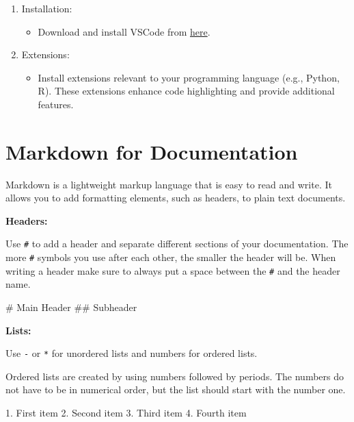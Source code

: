 \documentclass[
  letterpaper,
  DIV=11,
  numbers=noendperiod]{scrreprt}
\newenvironment{Shaded}{}{}
\newcommand{\FunctionTok}[1]{\textcolor[rgb]{0.44,0.26,0.76}{#1}}
\newcommand{\NormalTok}[1]{\textcolor[rgb]{0.14,0.16,0.18}{#1}}
\newcommand{\SpecialStringTok}[1]{\textcolor[rgb]{0.01,0.18,0.38}{#1}}
\providecommand{\tightlist}{%
  \setlength{\itemsep}{0pt}\setlength{\parskip}{0pt}}\usepackage{longtable,booktabs,array}
\begin{document}
\begin{enumerate}
\def\labelenumi{\arabic{enumi}.}
\tightlist
\item
  Installation:

  \begin{itemize}
  \tightlist
  \item
    Download and install VSCode from
    \href{https://code.visualstudio.com/}{here}.
  \end{itemize}
\item
  Extensions:

  \begin{itemize}
  \tightlist
  \item
    Install extensions relevant to your programming language (e.g.,
    Python, R). These extensions enhance code highlighting and provide
    additional features.
  \end{itemize}
\end{enumerate}

\section{Markdown for Documentation}\label{markdown-for-documentation}

Markdown is a lightweight markup language that is easy to read and
write. It allows you to add formatting elements, such as headers, to
plain text documents.

\textbf{Headers:}

Use \texttt{\#} to add a header and separate different sections of your
documentation. The more \texttt{\#} symbols you use after each other,
the smaller the header will be. When writing a header make sure to
always put a space between the \texttt{\#} and the header name.

\begin{Shaded}
\begin{Highlighting}[]
\FunctionTok{\# Main Header}
\FunctionTok{\#\# Subheader}
\end{Highlighting}
\end{Shaded}

\textbf{Lists:}

Use \texttt{-} or \texttt{*} for unordered lists and numbers for ordered
lists.

Ordered lists are created by using numbers followed by periods. The
numbers do not have to be in numerical order, but the list should start
with the number one.

\begin{Shaded}
\begin{Highlighting}[]
\SpecialStringTok{1. }\NormalTok{First item}
\SpecialStringTok{2. }\NormalTok{Second item}
\SpecialStringTok{3. }\NormalTok{Third item}
\SpecialStringTok{4. }\NormalTok{Fourth item }
\end{Highlighting}
\end{Shaded}
\end{document}

